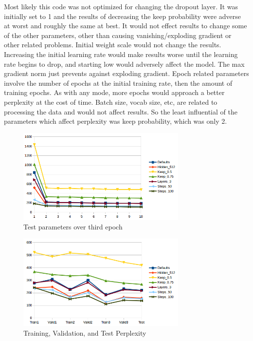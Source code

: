 \documentclass[10pt,a4paper]{article}
\begin{document}
Most likely this code was not optimized for changing the dropout layer. It was initially set to 1 and the results of decreasing the keep probability were adverse at worst and roughly the same at best. It would not effect results to change some of the other parameters, other than causing vanishing/exploding gradient or other related problems. Initial weight scale would not change the results. Increasing the initial learning rate would make results worse until the learning rate begins to drop, and starting low would adversely affect the model. The max gradient norm just prevents against exploding gradient. Epoch related parameters involve the number of epochs at the initial training rate, then the amount of training epochs. As with any mode, more epochs would approach a better perplexity at the cost of time. Batch size, vocab size, etc, are related to processing the data and would not affect results. So the least influential of the parameters which affect perplexity was keep probability, which was only 2.



\begin{figure}[t]
  \begin{center}
    \includegraphics[width=0.75\textwidth]{epochs1.png}
    \caption{Test parameters over third epoch}
  \end{center}
\end{figure}


\begin{figure}[b]
  \begin{center}
    \includegraphics[width=0.75\textwidth] {train-valid-test1.png}
    \caption{Training, Validation, and Test Perplexity}
  \end{center}
\end{figure}
\end{document}
